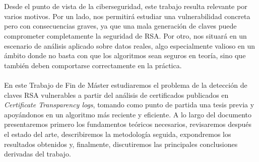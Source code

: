 \\
\\
Desde el punto de vista de la ciberseguridad, este trabajo resulta relevante por varios motivos. Por un lado, nos permitirá estudiar una vulnerabilidad concreta pero con consecuencias graves, ya que una mala generación de claves puede comprometer completamente la seguridad de RSA. Por otro, nos situará en un escenario de análisis aplicado sobre datos reales, algo especialmente valioso en un ámbito donde no basta con que los algoritmos sean seguros en teoría, sino que también deben comportarse correctamente en la práctica.
\\
\\
En este Trabajo de Fin de Máster estudiaremos el problema de la detección de claves RSA vulnerables a partir del análisis de certificados publicados en \textit{Certificate Transparency logs}, tomando como punto de partida una tesis previa y apoyándonos en un algoritmo más reciente y eficiente. A lo largo del documento presentaremos primero los fundamentos teóricos necesarios, revisaremos después el estado del arte, describiremos la metodología seguida, expondremos los resultados obtenidos y, finalmente, discutiremos las principales conclusiones derivadas del trabajo.